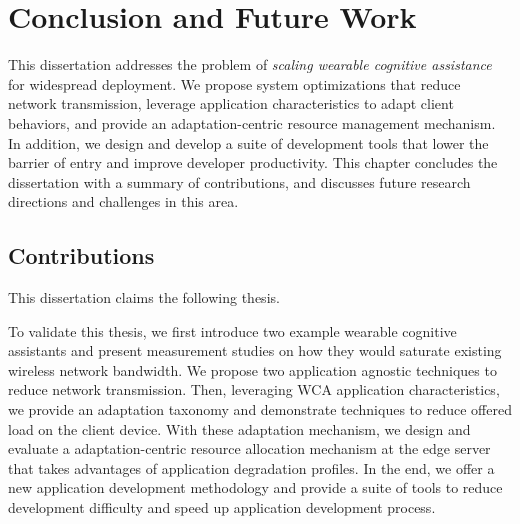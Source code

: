 \chapter{Conclusion and Future Work}
\label{chapter: conclusion}

This dissertation addresses the problem of \textit{scaling wearable cognitive
assistance} for widespread deployment. We propose system optimizations that
reduce network transmission, leverage application characteristics to adapt
client behaviors, and provide an adaptation-centric resource management
mechanism. In addition, we design and develop a suite of development tools that
lower the barrier of entry and improve developer productivity. This chapter
concludes the dissertation with a summary of contributions, and discusses future
research directions and challenges in this area.

\section{Contributions}

This dissertation claims the following thesis.

\noindent{}

To validate this thesis, we first introduce two example wearable cognitive
assistants and present measurement studies on how they would saturate existing
wireless network bandwidth. We propose two application agnostic techniques to
reduce network transmission. Then, leveraging WCA application characteristics,
we provide an adaptation taxonomy and demonstrate techniques to reduce offered
load on the client device. With these adaptation mechanism, we design and
evaluate a adaptation-centric resource allocation mechanism at the edge server
that takes advantages of application degradation profiles. In the end, we offer
a new application development methodology and provide a suite of tools to reduce
development difficulty and speed up application development process.

